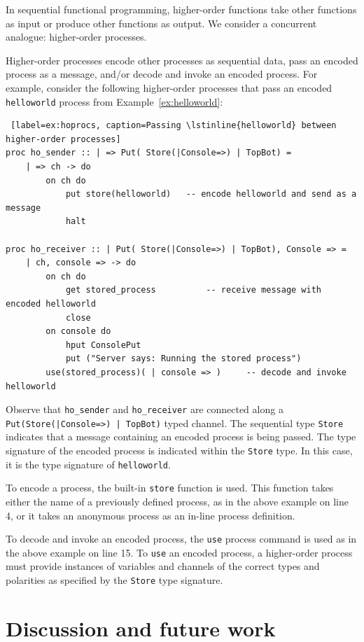 \documentclass[11pt]{article}
\begin{document}
In sequential functional programming, higher-order functions take other functions as input or produce other functions as output.
We consider a concurrent analogue: higher-order processes.

Higher-order processes encode other processes as sequential data, pass an encoded process as a message, and/or decode and invoke an encoded process.
For example, consider the following higher-order processes that pass an encoded \lstinline$helloworld$ process from Example~\ref{ex:helloworld}:
\begin{lstlisting} [label=ex:hoprocs, caption=Passing \lstinline{helloworld} between higher-order processes] 
proc ho_sender :: | => Put( Store(|Console=>) | TopBot) =
    | => ch -> do
        on ch do 
            put store(helloworld) 	-- encode helloworld and send as a message
            halt

proc ho_receiver :: | Put( Store(|Console=>) | TopBot), Console => =
    | ch, console => -> do
        on ch do
            get stored_process 			-- receive message with encoded helloworld
            close 
        on console do 
            hput ConsolePut 
            put ("Server says: Running the stored process")
        use(stored_process)( | console => )		-- decode and invoke helloworld
\end{lstlisting}
Observe that \lstinline$ho_sender$ and \lstinline$ho_receiver$ are connected along a \lstinline$Put(Store(|Console=>) | TopBot)$ typed channel.
The sequential type \lstinline$Store$ indicates that a message containing an encoded process is being passed.
The type signature of the encoded process is indicated within the \lstinline$Store$ type.
In this case, it is the type signature of \lstinline$helloworld$.

To encode a process, the built-in \lstinline$store$ function is used.
This function takes either the name of a previously defined process, as in the above example on line 4, or it takes an anonymous process as an in-line process definition.

To decode and invoke an encoded process, the \lstinline$use$ process command is used as in the above example on line 15.
To \lstinline$use$ an encoded process, a higher-order process must provide instances of variables and channels of the correct types and polarities as specified by the \lstinline$Store$ type signature.


\section{Discussion and future work}
\end{document}
